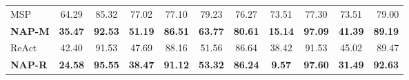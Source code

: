 \begin{table}[!t]
{\begin{tabular}{LcccccccccR}
MSP~\cite{hendrycks2016msp}                          & 64.29          & 85.32                              & 77.02                              & 77.10                              & 79.23                              & 76.27                              & 73.51                              & 77.30                              & 73.51          & 79.00           \\
\textbf{NAP-M}                                       & \textbf{35.47}          & \textbf{92.53}                              & \textbf{51.19}                     & \textbf{86.51}                     & \textbf{63.77}                     & \textbf{80.61}                     & \textbf{15.14}                              &  \textbf{97.09}                             & \textbf{41.39} & \textbf{89.19}                     \\ 
ReAct~\cite{sun2021react}                           & 42.40          & 91.53                              & 47.69                              & 88.16                              & 51.56                              & 86.64                              & 38.42                              & 91.53                              & 45.02          & 89.47                              \\
\textbf{NAP-R}                                       & \textbf{24.58} & \textbf{95.55}                     & \textbf{38.47}                               & \textbf{91.12}                             & \textbf{53.32}                              & \textbf{86.24}                              & \textbf{9.57}                      & \textbf{97.60}                     & \textbf{31.49}          & \textbf{92.63}                     \\  \bottomrule
\end{tabular}
}
\end{table}


